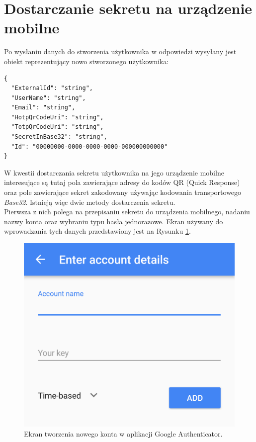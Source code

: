 \section{Dostarczanie sekretu na urządzenie mobilne}
Po wysłaniu danych do stworzenia użytkownika w odpowiedzi wysyłany jest obiekt reprezentujący
nowo stworzonego użytkownika:
\begin{lstlisting}
{
  "ExternalId": "string",
  "UserName": "string",
  "Email": "string",
  "HotpQrCodeUri": "string",
  "TotpQrCodeUri": "string",
  "SecretInBase32": "string",
  "Id": "00000000-0000-0000-0000-000000000000"
}
\end{lstlisting}
W kwestii dostarczania sekretu użytkownika na jego urządzenie mobilne interesujące są tutaj pola
zawierające adresy do kodów QR (Quick Response) oraz pole zawierające sekret zakodowany używając kodowania transportowego \textit{Base32}.
Istnieją więc dwie metody dostarczenia sekretu. \\
Pierwsza z nich polega na przepisaniu sekretu do urządzenia mobilnego, nadaniu nazwy konta oraz wybraniu typu hasła jednorazowe.
Ekran używany do wprowadzania tych danych przedstawiony jest na Rysunku \ref{mobile-manual}.
\begin{figure}[t]
    \centering
	\includegraphics[width=\textwidth]{content/images/mobile-manual}
    \caption{Ekran tworzenia nowego konta w aplikacji Google Authenticator.}
    \label{mobile-manual}
\end{figure} \\
